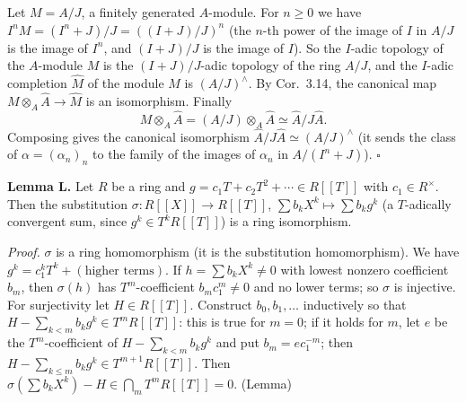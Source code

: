 \documentclass[11pt]{article}
\begin{document}
\pf
Let $M=A/J$, a finitely generated $A$-module. For $n\ge0$ we have $I^nM=(I^n+J)/J=((I+J)/J)^n$ (the $n$-th power of the image of $I$ in $A/J$ is the image of $I^n$, and $(I+J)/J$ is the image of $I$). So the $I$-adic topology of the $A$-module $M$ is the $(I+J)/J$-adic topology of the ring $A/J$, and the $I$-adic completion $\widehat{M}$ of the module $M$ is $(A/J)^\wedge$. By Cor.~3.14, the canonical map $M\otimes_A\widehat{A}\to\widehat{M}$ is an isomorphism. Finally
\[ M\otimes_A\widehat{A}=(A/J)\otimes_A\widehat{A}\simeq\widehat{A}/J\widehat{A}. \]
Composing gives the canonical isomorphism $\widehat{A}/J\widehat{A}\simeq(A/J)^\wedge$ (it sends the class of $\alpha=(\alpha_n)_n$ to the family of the images of $\alpha_n$ in $A/(I^n+J)$). \hfill$\square$

\pf
\textbf{Lemma L.} Let $R$ be a ring and $g=c_1T+c_2T^2+\cdots\in R[[T]]$ with $c_1\in R^\times$. Then the substitution $\sigma:R[[X]]\to R[[T]]$, $\sum b_kX^k\mapsto\sum b_kg^k$ (a $T$-adically convergent sum, since $g^k\in T^kR[[T]]$) is a ring isomorphism.

\emph{Proof.} $\sigma$ is a ring homomorphism (it is the substitution homomorphism). We have $g^k=c_1^kT^k+(\text{higher terms})$. If $h=\sum b_kX^k\ne0$ with lowest nonzero coefficient $b_m$, then $\sigma(h)$ has $T^m$-coefficient $b_mc_1^m\ne0$ and no lower terms; so $\sigma$ is injective. For surjectivity let $H\in R[[T]]$. Construct $b_0,b_1,\dots$ inductively so that $H-\sum_{k<m}b_kg^k\in T^mR[[T]]$: this is true for $m=0$; if it holds for $m$, let $e$ be the $T^m$-coefficient of $H-\sum_{k<m}b_kg^k$ and put $b_m=ec_1^{-m}$; then $H-\sum_{k\le m}b_kg^k\in T^{m+1}R[[T]]$. Then $\sigma(\sum b_kX^k)-H\in\bigcap_mT^mR[[T]]=0$. \hfill(Lemma)
\end{document}
